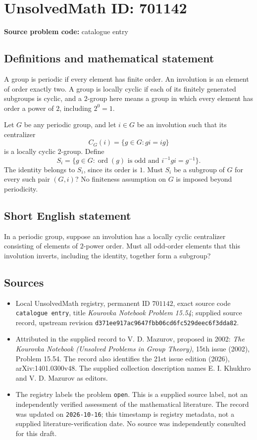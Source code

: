 \documentclass[11pt]{article}
\begin{document}
\section*{UnsolvedMath ID: 701142}
\textbf{Source problem code:} catalogue entry
\subsection{Definitions and mathematical statement}
A group is periodic if every element has finite order. An involution is an element of order exactly two. A group is locally cyclic if each of its finitely generated subgroups is cyclic, and a \(2\)-group here means a group in which every element has order a power of \(2\), including \(2^0=1\).

Let \(G\) be any periodic group, and let \(i\in G\) be an involution such that its centralizer
\[
C_G(i)=\{g\in G:gi=ig\}
\]
is a locally cyclic \(2\)-group. Define
\[
S_i=\{g\in G:\operatorname{ord}(g)\text{ is odd and }i^{-1}gi=g^{-1}\}.
\]
The identity belongs to \(S_i\), since its order is \(1\). Must \(S_i\) be a subgroup of \(G\) for every such pair \((G,i)\)? No finiteness assumption on \(G\) is imposed beyond periodicity.
\subsection{Short English statement}
In a periodic group, suppose an involution has a locally cyclic centralizer consisting of elements of \(2\)-power order. Must all odd-order elements that this involution inverts, including the identity, together form a subgroup?
\subsection{Sources}
\begin{itemize}
\item Local UnsolvedMath registry, permanent ID \(701142\), exact source code \texttt{catalogue entry}, title \emph{Kourovka Notebook Problem 15.54}; supplied source record, upstream revision \texttt{d371ee917ac9647fbb06cd6fc529deec6f3dda82}.
\item Attributed in the supplied record to V. D. Mazurov, proposed in 2002: \emph{The Kourovka Notebook (Unsolved Problems in Group Theory)}, 15th issue (2002), Problem 15.54. The record also identifies the 21st issue edition (2026), arXiv:1401.0300v48. The supplied collection description names E. I. Khukhro and V. D. Mazurov as editors.
\item The registry labels the problem \texttt{open}. This is a supplied source label, not an independently verified assessment of the mathematical literature. The record was updated on \texttt{2026-10-16}; this timestamp is registry metadata, not a supplied literature-verification date. No source was independently consulted for this draft.
\end{itemize}
\end{document}
